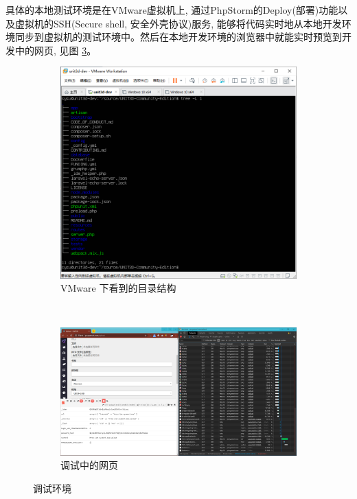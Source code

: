 
具体的本地测试环境是在VMware虚拟机上, 通过PhpStorm的Deploy(部署)功能以及虚拟机的SSH(Secure shell, 安全外壳协议)服务, 能够将代码实时地从本地开发环境同步到虚拟机的测试环境中。然后在本地开发环境的浏览器中就能实时预览到开发中的网页, 见图 \ref{fig:devenv}。

\begin{figure}[h]
	\centering
    \begin{subfigure}{0.8\textwidth}
		\centering
		\includegraphics[width=\textwidth]{support-files/4.1-vwmare-unit3d-dev.png}
		\caption{VMware 下看到的目录结构}
		\label{fig:vmware}
	\end{subfigure} \\
    \begin{subfigure}{0.8\textwidth}
		\centering
		\includegraphics[width=\textwidth]{support-files/4.1-web-idehelper-chrome-devtool.png}
		\caption{调试中的网页}
		\label{fig:chromedevtool}
	\end{subfigure} 
    \caption{调试环境}
	\label{fig:devenv}
\end{figure}

